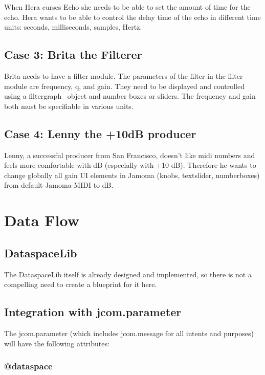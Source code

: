 \documentclass[]{article}
\begin{document}
When Hera curses Echo she needs to be able to set the amount of time for the echo.  Hera wants to be able to control the delay time of the echo in different time units: seconds, milliseconds, samples, Hertz.


\subsection{Case 3: Brita the Filterer}

Brita needs to have a filter module.  The parameters of the filter in the filter module are frequency, q, and gain.  They need to be displayed and controlled using a filtergraph~ object and number boxes or sliders.  The frequency and gain both must be specifiable in various units.

\subsection{Case 4: Lenny the +10dB producer}
Lenny, a successful producer from San Francisco, doesn't like midi numbers and feels more comfortable with dB (especially with +10 dB). Therefore he wants to change globally all gain UI elements in Jamoma  (knobs, textslider, numberboxes) from default Jamoma-MIDI to dB. 



\section{Data Flow}

\subsection{DataspaceLib}

The DataspaceLib itself is already designed and implemented, so there is not a compelling need to create a blueprint for it here.



\subsection{Integration with jcom.parameter}

The jcom.parameter (which includes jcom.message for all intents and purposes) will have the following attributes:


\subsubsection{@dataspace}
\end{document}
